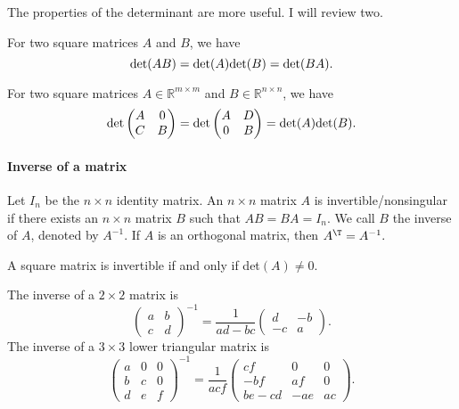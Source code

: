 The properties of the determinant are more useful. I will review two.

\begin{proposition}
For two square matrices $A$ and $B$, we have
$$
\textup{det}(AB) = \textup{det}(A) \textup{det}(B)  = \textup{det}(BA). 
$$
\end{proposition}



\begin{proposition}
For two square matrices $A \in \mathbb{R}^{m\times m}$ and $B \in \mathbb{R}^{n \times n}$, we have
$$
\textup{det}
\begin{pmatrix}
A & 0 \\
C& B
\end{pmatrix}
= 
\textup{det}
\begin{pmatrix}
A & D \\
0& B
\end{pmatrix}
=
\textup{det}(A) \textup{det}(B) . 
$$
\end{proposition}




\paragraph*{Inverse of a matrix}

Let $I_{n}$ be the $n\times n$ identity matrix. An $n\times n$
matrix $A$ is invertible/nonsingular if there exists an $n\times n$ matrix
$B$ such that $AB=BA=I_{n}.$ We call $B$ the inverse of $A$, denoted
by $A^{-1}.$  If $A$ is an orthogonal matrix, then $A^{\T} =A^{-1}.$



A square matrix is invertible if and only if det$(A) \neq 0.$


The inverse of a $2\times 2$ matrix is
\begin{equation}
\label{eq::2X2-inverse}
\begin{pmatrix}
a & b \\
c& d
\end{pmatrix}^{-1}
= \frac{1}{ad - bc} \begin{pmatrix}
d & -b \\
-c& a
\end{pmatrix}.
\end{equation}
The inverse of a $3\times 3$ lower triangular matrix is
\begin{equation}
\label{eq::3X3-lower-inverse}
\left(\begin{array}{lll}
a & 0 & 0 \\
b & c & 0 \\
d & e & f
\end{array}\right)^{-1}=\frac{1}{a c f}\left(\begin{array}{ccc}
c f & 0 & 0 \\
-b f & a f & 0 \\
b e-c d & -a e & a c
\end{array}\right). 
\end{equation}



